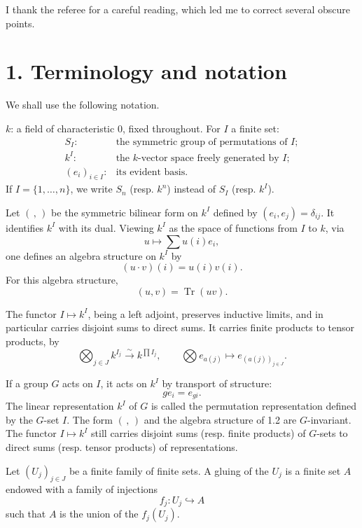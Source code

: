 \documentclass[11pt]{article}
\newcommand{\Tr}{\operatorname{Tr}}
\theoremstyle{deligne}
\newcommand{\para}[1]{\vspace{0.65em}\noindent{\bfseries #1}\quad}
\begin{document}
I thank the referee for a careful reading, which led me to correct several obscure points.

\section*{1. Terminology and notation}

\para{1.1.}
We shall use the following notation.

\(k\): a field of characteristic \(0\), fixed throughout. For \(I\) a finite set:
\[
\begin{array}{rl}
S_I:&\text{the symmetric group of permutations of }I;\\
k^I:&\text{the \(k\)-vector space freely generated by }I;\\
(e_i)_{i\in I}:&\text{its evident basis.}
\end{array}
\]
If \(I=\{1,\ldots,n\}\), we write \(S_n\) (resp. \(k^n\)) instead of \(S_I\) (resp. \(k^I\)).

\para{1.2.}
Let \((\, ,\, )\) be the symmetric bilinear form on \(k^I\) defined by \((e_i,e_j)=\delta_{ij}\). It identifies \(k^I\) with its dual. Viewing \(k^I\) as the space of functions from \(I\) to \(k\), via
\[
  u\longmapsto \sum u(i)e_i,
\]
one defines an algebra structure on \(k^I\) by
\[
  (u\cdot v)(i)=u(i)v(i).
\]
For this algebra structure,
\[
  (u,v)=\Tr(uv).
\]

\para{1.3.}
The functor \(I\mapsto k^I\), being a left adjoint, preserves inductive limits, and in particular carries disjoint sums to direct sums. It carries finite products to tensor products, by
\[
  \bigotimes_{j\in J} k^{I_j}\overset{\sim}{\longrightarrow}
  k^{\prod I_j},\qquad
  \bigotimes e_{a(j)}\longmapsto e_{(a(j))_{j\in J}}.
\]

\para{1.4.}
If a group \(G\) acts on \(I\), it acts on \(k^I\) by transport of structure:
\[
  g e_i=e_{g i}.
\]
The linear representation \(k^I\) of \(G\) is called the permutation representation defined by the \(G\)-set \(I\). The form \((\, ,\, )\) and the algebra structure of 1.2 are \(G\)-invariant. The functor \(I\mapsto k^I\) still carries disjoint sums (resp. finite products) of \(G\)-sets to direct sums (resp. tensor products) of representations.

\para{1.5.}
Let \((U_j)_{j\in J}\) be a finite family of finite sets. A gluing of the \(U_j\) is a finite set \(A\) endowed with a family of injections
\[
  f_j:U_j\hookrightarrow A
\]
such that \(A\) is the union of the \(f_j(U_j)\).
\end{document}
